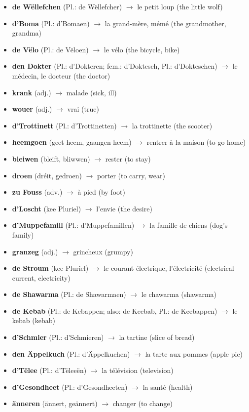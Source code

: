 \begin{itemize}
    \item \textbf{de Wëllefchen} (Pl.: de Wëllefcher) $\rightarrow$ le petit loup (the little wolf)
    \item \textbf{d'Boma} (Pl.: d'Bomaen) $\rightarrow$ la grand-mère, mémé (the grandmother, grandma)
    \item \textbf{de Vëlo} (Pl.: de Vëloen) $\rightarrow$ le vélo (the bicycle, bike)
    \item \textbf{den Dokter} (Pl.: d'Dokteren; fem.: d'Doktesch, Pl.: d'Dokteschen) $\rightarrow$ le médecin, le docteur (the doctor)
    \item \textbf{krank} (adj.) $\rightarrow$ malade (sick, ill)
    \item \textbf{wouer} (adj.) $\rightarrow$ vrai (true)
    \item \textbf{d'Trottinett} (Pl.: d'Trottinetten) $\rightarrow$ la trottinette (the scooter)
    \item \textbf{heemgoen} (geet heem, gaangen heem) $\rightarrow$ rentrer à la maison (to go home)
    \item \textbf{bleiwen} (bleift, bliwwen) $\rightarrow$ rester (to stay)
    \item \textbf{droen} (dréit, gedroen) $\rightarrow$ porter (to carry, wear)
    \item \textbf{zu Fouss} (adv.) $\rightarrow$ à pied (by foot)
    \item \textbf{d'Loscht} (kee Pluriel) $\rightarrow$ l'envie (the desire)
    \item \textbf{d'Muppefamill} (Pl.: d'Muppefamillen) $\rightarrow$ la famille de chiens (dog's family)
    \item \textbf{granzeg} (adj.) $\rightarrow$ grincheux (grumpy)
    \item \textbf{de Stroum} (kee Pluriel) $\rightarrow$ le courant électrique, l'électricité (electrical current, electricity)
    \item \textbf{de Shawarma} (Pl.: de Shawarmaen) $\rightarrow$ le chawarma (shawarma)
    \item \textbf{de Kebab} (Pl.: de Kebappen; also: de Keebab, Pl.: de Keebappen) $\rightarrow$ le kebab (kebab)
    \item \textbf{d'Schmier} (Pl.: d'Schmieren) $\rightarrow$ la tartine (slice of bread)
    \item \textbf{den Äppelkuch} (Pl.: d'Äppelkuchen) $\rightarrow$ la tarte aux pommes (apple pie)
    \item \textbf{d'Tëlee} (Pl.: d'Tëleeën) $\rightarrow$ la télévision (television)
    \item \textbf{d'Gesondheet} (Pl.: d'Gesondheeten) $\rightarrow$ la santé (health)
    \item \textbf{änneren} (ännert, geännert) $\rightarrow$ changer (to change)
\end{itemize}


